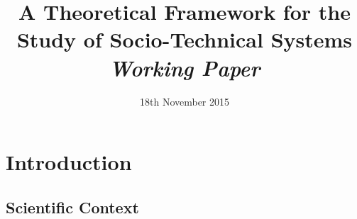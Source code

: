 


\title{
A Theoretical Framework for the Study of Socio-Technical Systems
\bigskip\\
\textit{Working Paper}
}
\author{}
\date{18th November 2015}


\maketitle

\justify






\section*{Introduction}

\subsection*{Scientific Context}

